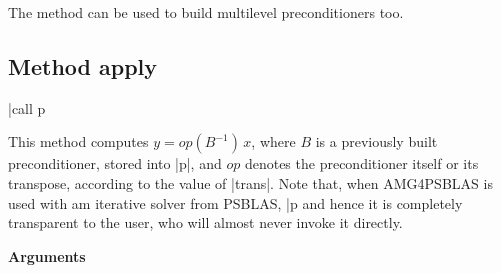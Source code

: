 \noindent
The method can be used to build multilevel preconditioners too.


\clearpage
\subsection{Method apply\label{sec:precapply}}

\begin{center}
\fortinline|call p%
\end{center}

\noindent
This method computes $y = op(B^{-1})\, x$, where $B$ is a previously built
preconditioner, stored into \fortinline|p|, and $op$
denotes the preconditioner itself or its transpose, according to
the value of \fortinline|trans|.
Note that, when AMG4PSBLAS is used with am iterative solver from PSBLAS,
\fortinline|p%
and hence it is completely transparent to the user, who will almost
never invoke it directly.

{\baselineskip\noindent\large\bfseries Arguments} \smallskip

